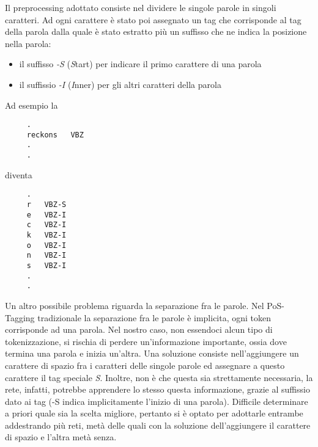 Il preprocessing adottato consiste nel dividere le singole parole in singoli caratteri.
Ad ogni carattere \`e stato poi assegnato un tag che corrisponde al tag della parola dalla quale \`e stato estratto pi\`u un suffisso che ne indica la posizione nella parola:

\begin{itemize}
  \item il suffisso \emph{-S} (\emph{S}tart) per indicare il primo carattere di una parola
  \item il suffissio \emph{-I} (\emph{I}nner) per gli altri caratteri della parola
\end{itemize}

Ad esempio la

\begin{center}
  \begin{minipage}{5cm}
    \begin{verbatim}
     .
     reckons   VBZ
     .
     .
    \end{verbatim}
  \end{minipage}
\end{center}

diventa

\begin{center}
  \begin{minipage}{5cm}
    \begin{verbatim}
     .
     r   VBZ-S
     e   VBZ-I
     c   VBZ-I
     k   VBZ-I
     o   VBZ-I
     n   VBZ-I
     s   VBZ-I
     .
     .
    \end{verbatim}
  \end{minipage}
\end{center}

Un altro possibile problema riguarda la separazione fra le parole.
Nel PoS-Tagging tradizionale la separazione fra le parole \`e implicita, ogni token corrisponde ad una parola.
Nel nostro caso, non essendoci alcun tipo di tokenizzazione, si rischia di perdere un'informazione importante, ossia dove termina una parola e inizia un'altra.
Una soluzione consiste nell'aggiungere un carattere di spazio fra i caratteri delle singole parole ed assegnare a questo carattere il tag speciale \emph{S}.
Inoltre, non \`e che questa sia strettamente necessaria, la rete, infatti, potrebbe apprendere lo stesso questa informazione, grazie al suffissio dato ai tag (-S indica implicitamente l'inizio di una parola).
Difficile determinare a priori quale sia la scelta migliore, pertanto si \`e optato per adottarle entrambe addestrando pi\`u reti, met\`a delle quali con la soluzione dell'aggiungere il carattere di spazio e l'altra met\`a senza.

